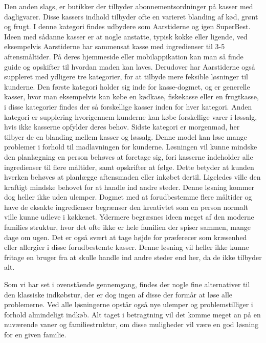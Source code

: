 Den anden slags, er butikker der tilbyder abonnementsordninger på kasser med dagligvarer.
Disse kassers indhold tilbyder ofte en varieret blanding af kød, grønt og frugt.
I denne kategori findes udbydere som Aarstiderne og igen SuperBest\citep{SOTA_MP_AAR, SOTA_MP_SB}.
Ideen med sådanne kasser er at nogle anstatte, typisk kokke eller ligende, ved eksempelvis Aarstiderne har sammensat kasse med ingredienser til 3-5 aftensmåltider.
På deres hjemmeside eller mobilappikation kan man så finde guide og opskifter til hvordan maden kan laves.
Derudover har Aarstiderne også suppleret med ydligere tre kategorier, for at tilbyde mere feksible løsninger til kunderne.
Den første kategori holder sig inde for kasse-dogmet, og er generelle kasser, hvor man eksempelvis kan købe en kødkase, fiskekasse eller en frugtkasse, i disse kategorier findes der så forskellige kasser inden for hver kategori.
Anden kategori er supplering hvorigennem kunderne kan købe forskellige varer i løssalg, hvis ikke kasserne opfylder deres behov.
Sidste kategori er morgenmad, her tilbyer de en blanding mellem kasser og løssalg.
Denne model kan løse mange problemer i forhold til madlavningen for kunderne.
Løsningen vil kunne mindske den planlægning en person behøves at foretage sig, fori kasserne indeholder alle ingredienser til flere måltider, samt opskrifter at følge.
Dette betyder at kunden  hverken behøves at planlægge aftensmaden eller inkøbet dertil.
Ligeledes ville den kraftigt mindske behovet for at handle ind andre steder.
Denne løsning kommer dog heller ikke uden ulemper.
Dogmet med at forudbestemme flere måltider og have de eksakte ingredienser begrænser den kreativtet som en person normalt ville kunne udleve i køkkenet.
Ydermere begræsnes ideen meget af den moderne families struktur, hvor det ofte ikke er hele familien der spiser sammen, mange dage om ugen.
Det er også svært at tage højde for præferecer som kræsenhed eller allergier i disse forudbestemte kasser.
Denne løsning vil heller ikke kunne fritage en bruger fra at skulle handle ind andre steder end her, da de ikke tilbyder alt.


Som vi har set i ovenstående gennemgang, findes der nogle fine alternativer til den klassiske indkøbstur, der er dog ingen af disse der formår at løse alle problemerne.
Ved alle løsningerne opstår også nye ulemper og problemstilliger i forhold almindeligt indkøb.
Alt taget i betragtning vil det komme meget an på en nuværende vaner og familiestruktur, om disse muligheder vil være en god løsning for en given familie.


